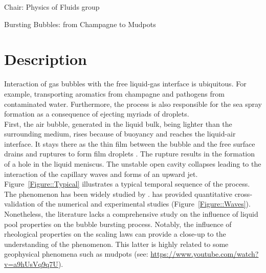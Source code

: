 \documentclass[a4paper,10pt]{article}
\begin{document}
\noindent Chair: Physics of Fluids group
\begin{center}
 \begin{LARGE}
  Bursting Bubbles: from Champagne to Mudpots
 \end{LARGE}
\end{center}
\section*{Description}
Interaction of gas bubbles with the free liquid-gas interface is ubiquitous. For example, transporting aromatics from champagne and pathogens from contaminated water. Furthermore, the process is also responsible for the sea spray formation as a consequence of ejecting myriads of droplets.\\
First, the air bubble, generated in the liquid bulk, being lighter than the surrounding medium, rises because of buoyancy and reaches the liquid-air interface. It stays there as the thin film between the bubble and the free surface drains and ruptures to form film droplets \citep{lhuissier2012bursting}. The rupture results in the formation of a hole in the liquid meniscus. The unstable open cavity collapses leading to the interaction of the capillary waves and forms of an upward jet.
Figure~\ref{Figure::Typical} illustrates a typical temporal sequence of the process. The phenomenon has been widely studied by \cite{duchemin2002jet, deike2018dynamics, PhysRevFluids.3.091601}.
\cite{deike2018dynamics} has provided quantitative cross-validation of the numerical and experimental studies (Figure~\ref{Figure::Waves}). Nonetheless, the literature lacks a comprehensive study on the influence of liquid pool properties on the bubble bursting process. Notably, the influence of rheological properties on the scaling laws can provide a close-up to the understanding of the phenomenon. This latter is highly related to some geophysical phenomena such as mudpots (see: \href{https://www.youtube.com/watch?v=a9hUsVq9q7U}{https://www.youtube.com/watch?v=a9hUsVq9q7U}).
\end{document}

